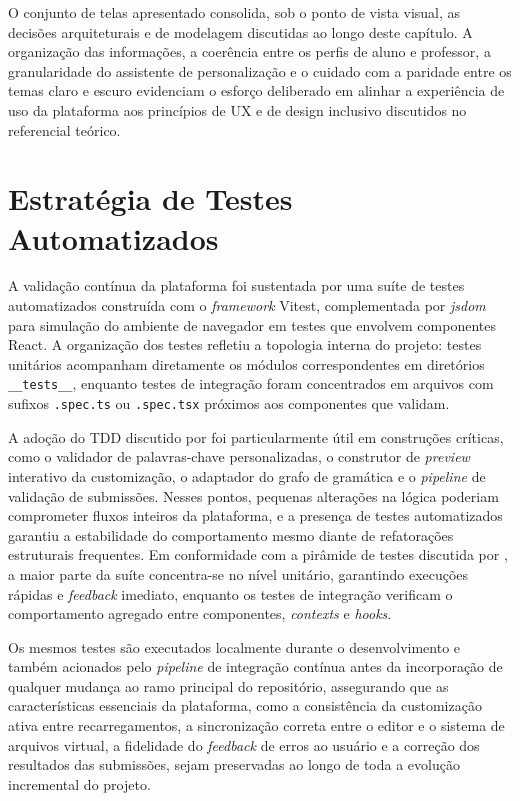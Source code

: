 O conjunto de telas apresentado consolida, sob o ponto de vista visual, as decisões arquiteturais e de modelagem discutidas ao longo deste capítulo. A organização das informações, a coerência entre os perfis de aluno e professor, a granularidade do assistente de personalização e o cuidado com a paridade entre os temas claro e escuro evidenciam o esforço deliberado em alinhar a experiência de uso da plataforma aos princípios de UX e de design inclusivo discutidos no referencial teórico.

\section{Estratégia de Testes Automatizados}
\label{sec:testes-plataforma}

A validação contínua da plataforma foi sustentada por uma suíte de testes automatizados construída com o \textit{framework} Vitest, complementada por \textit{jsdom} para simulação do ambiente de navegador em testes que envolvem componentes React. A organização dos testes refletiu a topologia interna do projeto: testes unitários acompanham diretamente os módulos correspondentes em diretórios \texttt{\_\_tests\_\_}, enquanto testes de integração foram concentrados em arquivos com sufixos \texttt{.spec.ts} ou \texttt{.spec.tsx} próximos aos componentes que validam.

A adoção do TDD discutido por  foi particularmente útil em construções críticas, como o validador de palavras-chave personalizadas, o construtor de \textit{preview} interativo da customização, o adaptador do grafo de gramática e o \textit{pipeline} de validação de submissões. Nesses pontos, pequenas alterações na lógica poderiam comprometer fluxos inteiros da plataforma, e a presença de testes automatizados garantiu a estabilidade do comportamento mesmo diante de refatorações estruturais frequentes. Em conformidade com a pirâmide de testes discutida por , a maior parte da suíte concentra-se no nível unitário, garantindo execuções rápidas e \textit{feedback} imediato, enquanto os testes de integração verificam o comportamento agregado entre componentes, \textit{contexts} e \textit{hooks}.

Os mesmos testes são executados localmente durante o desenvolvimento e também acionados pelo \textit{pipeline} de integração contínua antes da incorporação de qualquer mudança ao ramo principal do repositório, assegurando que as características essenciais da plataforma, como a consistência da customização ativa entre recarregamentos, a sincronização correta entre o editor e o sistema de arquivos virtual, a fidelidade do \textit{feedback} de erros ao usuário e a correção dos resultados das submissões, sejam preservadas ao longo de toda a evolução incremental do projeto.
